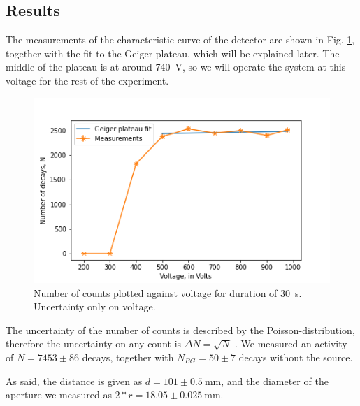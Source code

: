 \subsection{Results}

The measurements of the characteristic curve of the detector are shown in Fig. \ref{fig::plateau}, together with the fit to the Geiger plateau, which will be explained later.
The middle of the plateau is at around \SI{740}{\volt}, so we will operate the system at this voltage for the rest of the experiment.

\begin{figure} [ht]
	\centering
	\includegraphics[width=400pt]{python/plateau.PNG}
	\caption{Number of counts plotted against voltage for duration of \SI{30}{\second}. Uncertainty only on voltage.}
	\label{fig::plateau}
\end{figure}

The uncertainty of the number of counts is described by the Poisson-distribution, therefore the uncertainty on any count is $\Delta N = \sqrt{N}$ \cite{manual}.
We measured an activity of $N = 7453 \pm  86$ decays, together with $N_{BG} = 50 \pm 7$ decays without the source.

As said, the distance is given as $d = 101 \pm \SI{0.5}{\milli\meter}$, and the diameter of the aperture we measured as $2*r = 18.05 \pm \SI{0.025}{\milli\meter}$.